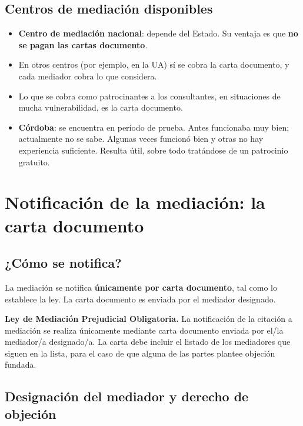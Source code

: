 \documentclass[12pt,oneside]{book}
\begin{document}
\subsection{Centros de mediación disponibles}

\begin{itemize}
    \item \textbf{Centro de mediación nacional}: depende del Estado. Su ventaja es que \textbf{no se pagan las cartas documento}.
    \item En otros centros (por ejemplo, en la UA) sí se cobra la carta documento, y cada mediador cobra lo que considera.
    \item Lo que se cobra como patrocinantes a los consultantes, en situaciones de mucha vulnerabilidad, es la carta documento.
    \item \textbf{Córdoba}: se encuentra en período de prueba. Antes funcionaba muy bien; actualmente no se sabe. Algunas veces funcionó bien y otras no hay experiencia suficiente. Resulta útil, sobre todo tratándose de un patrocinio gratuito.
\end{itemize}


\section{Notificación de la mediación: la carta documento}

\subsection{¿Cómo se notifica?}

La mediación se notifica \textbf{únicamente por carta documento}, tal como lo establece la ley. La carta documento es enviada por el mediador designado.

\begin{important}
\textbf{Ley de Mediación Prejudicial Obligatoria.} La notificación de la citación a mediación se realiza únicamente mediante carta documento enviada por el/la mediador/a designado/a. La carta debe incluir el listado de los mediadores que siguen en la lista, para el caso de que alguna de las partes plantee objeción fundada.
\end{important}

\subsection{Designación del mediador y derecho de objeción}
\end{document}

